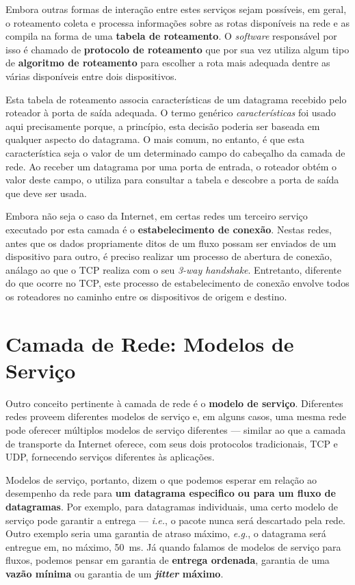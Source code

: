 \documentclass{article}
\begin{document}
Embora outras formas de interação entre estes serviços sejam possíveis, em geral, o roteamento coleta e processa informações sobre as rotas disponíveis na rede e as compila na forma de uma \textbf{tabela de roteamento}. O \textit{software} responsável por isso é chamado de \textbf{protocolo de roteamento} que por sua vez utiliza algum tipo de \textbf{algoritmo de roteamento} para escolher a rota mais adequada dentre as várias disponíveis entre dois dispositivos.

Esta tabela de roteamento associa características de um datagrama recebido pelo roteador à porta de saída adequada. O termo genérico \textit{características} foi usado aqui precisamente porque, a princípio, esta decisão poderia ser baseada em qualquer aspecto do datagrama. O mais comum, no entanto, é que esta característica seja o valor de um determinado campo do cabeçalho da camada de rede. Ao receber um datagrama por uma porta de entrada, o roteador obtém o valor deste campo, o utiliza para consultar a tabela e descobre a porta de saída que deve ser usada.

Embora não seja o caso da Internet, em certas redes um terceiro serviço executado por esta camada é o \textbf{estabelecimento de conexão}. Nestas redes, antes que os dados propriamente ditos de um fluxo possam ser enviados de um dispositivo para outro, é preciso realizar um processo de abertura de conexão, análago ao que o TCP realiza com o seu \textit{3-way handshake}. Entretanto, diferente do que ocorre no TCP, este processo de estabelecimento de conexão envolve todos os roteadores no caminho entre os dispositivos de origem e destino.

\section{Camada de Rede: Modelos de Serviço}

Outro conceito pertinente à camada de rede é o \textbf{modelo de serviço}. Diferentes redes proveem diferentes modelos de serviço e, em alguns casos, uma mesma rede pode oferecer múltiplos modelos de serviço diferentes --- similar ao que a camada de transporte da Internet oferece, com seus dois protocolos tradicionais, TCP e UDP, fornecendo serviços diferentes às aplicações.

Modelos de serviço, portanto, dizem o que podemos esperar em relação ao desempenho da rede para \textbf{um datagrama especifico ou para um fluxo de datagramas}. Por exemplo, para datagramas individuais, uma certo modelo de serviço pode garantir a entrega --- \textit{i.e.}, o pacote nunca será descartado pela rede. Outro exemplo seria uma garantia de atraso máximo, \textit{e.g.}, o datagrama será entregue em, no máximo, 50~ms. Já quando falamos de modelos de serviço para fluxos, podemos pensar em garantia de \textbf{entrega ordenada}, garantia de uma \textbf{vazão mínima} ou garantia de um \textbf{\textit{jitter} máximo}.
\end{document}
